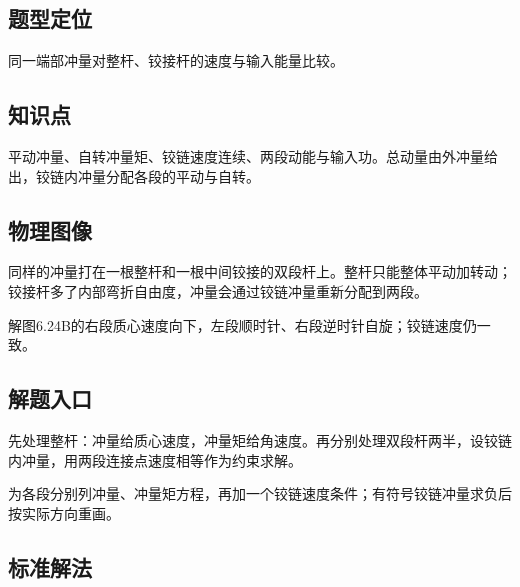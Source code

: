 \documentclass[UTF8,fontset=fandol,a4paper,11pt]{ctexart}
\begin{document}


\subsection*{题型定位}

同一端部冲量对整杆、铰接杆的速度与输入能量比较。



\subsection*{知识点}

平动冲量、自转冲量矩、铰链速度连续、两段动能与输入功。总动量由外冲量给出，铰链内冲量分配各段的平动与自转。




\subsection*{物理图像}

同样的冲量打在一根整杆和一根中间铰接的双段杆上。整杆只能整体平动加转动；铰接杆多了内部弯折自由度，冲量会通过铰链冲量重新分配到两段。

解图6.24B的右段质心速度向下，左段顺时针、右段逆时针自旋；铰链速度仍一致。



\subsection*{解题入口}

先处理整杆：冲量给质心速度，冲量矩给角速度。再分别处理双段杆两半，设铰链内冲量，用两段连接点速度相等作为约束求解。

为各段分别列冲量、冲量矩方程，再加一个铰链速度条件；有符号铰链冲量求负后按实际方向重画。



\subsection*{标准解法}
\end{document}
